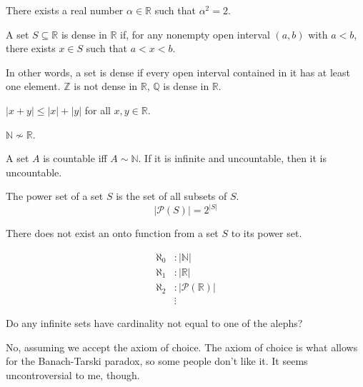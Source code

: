 \documentclass{article}
\begin{document}
\medskip
{}

    There exists a real number $\alpha \in \mathbb R$ such that $\alpha^2 = 2$.

\medskip
{}

A set $S \subseteq \mathbb R$ is dense in $\mathbb R$ if, for any nonempty open interval $(a,b)$ with $a < b$, there exists $x \in S$ such that $a < x < b$.

In other words, a set is dense if every open interval contained in it has at least one element. $\mathbb Z$ is not dense in $\mathbb R$, $\mathbb Q$ is dense in $\mathbb R$.

\medskip
{}

    $|x + y| \leq |x| + |y|$ for all $x,y \in \mathbb R$.

\medskip
{}

    $\mathbb N \not\sim \mathbb R$.
    
\medskip
{}

    A set $A$ is countable iff $A \sim \mathbb N$. If it is infinite and uncountable, then it is uncountable.
    
\medskip
{}

    The power set of a set $S$ is the set of all subsets of $S$.
    $$|\mathcal P(S)| = 2^{|S|}$$
    
\medskip
{}

    There does not exist an onto function from a set $S$ to its power set.
    
\medskip
{}

    \begin{align*}
        \aleph_0&: |\mathbb N| \\
        \aleph_1&: |\mathbb R| \\
        \aleph_2&: |\mathcal P(\mathbb R)| \\
                &\vdots
    \end{align*}

\medskip
{}

    Do any infinite sets have cardinality not equal to one of the alephs?

    No, assuming we accept the axiom of choice. The axiom of choice is what allows for the Banach-Tarski paradox, so some people don't like it. It seems uncontroversial to me, though.
    
\end{document}
